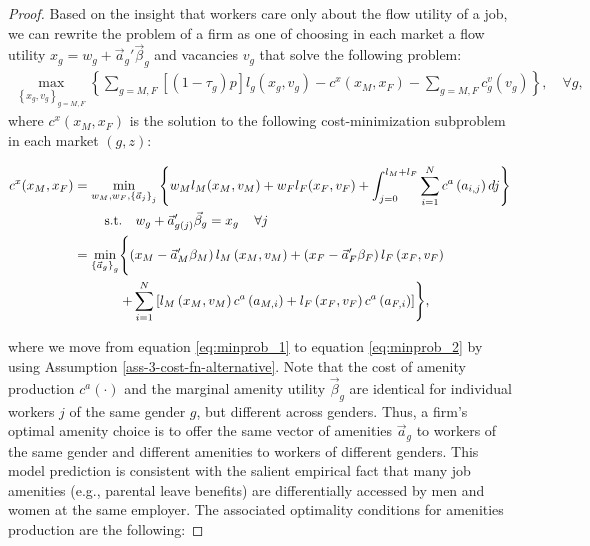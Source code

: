 \begin{proof}
    Based on the insight that workers care only about the flow utility of a job, we can rewrite the problem of a firm as one of choosing
    in each market a flow utility $x_{g}=w_{g}+\vec{a}_{g}'\vec{\beta}_{g}$ and vacancies $v_{g}$ that solve the following problem:
    \begin{align}
        \max_{\left\{ x_{g},v_{g}\right\}_{g=M,F}} \left\{ \sum_{g=M,F} \left[ (1 - \tau_g) p \right] l_{g}\left( x_{g}, v_{g} \right)-c^{x} \left( x_{M}, x_{F} \right) - \sum_{g=M,F} c_{g}^{v} \left( v_{g} \right) \right\} , \quad \forall g,
    \end{align}
    where $c^{x}\left(x_{M},x_{F}\right)$ is the solution to the following cost-minimization subproblem in each market $(g, z)$:
    \begin{small}
        \begin{align}
            c^{x}(x_{M},x_{F}) &= \min_{w_{M},w_{F},\left\{ \vec{a}_{j}\right\} _{j}}\left\{ w_{M}l_{M}(x_{M},v_{M})+w_{F}l_{F}(x_{F},v_{F})+\int_{j=0}^{l_{M}+l_{F}}\sum_{i=1}^{N}c^{a}\left(a_{i,j}\right)dj\right\} \label{eq:minprob_1} \\
            & \mathrel{\phantom{=}} \quad \text{s.t.}\quad w_{g}+\vec{a}_{g(j)}'\vec{\beta}_{g}=x_{g}\, \quad \forall j \nonumber \\
            &= \min_{\left\{ \vec{a}_{g} \right\}_{g}}\Biggl{\{} \left(x_{M}-\vec{a}_{M}'\beta_{M}\right)l_{M}\left(x_{M},v_{M}\right)+\left(x_{F}-\vec{a}_{F}'\beta_{F}\right)l_{F}\left(x_{F},v_{F}\right) \label{eq:minprob_2} \\
            & \mathrel{\phantom{=}} \quad\quad \,\, + \sum_{i=1}^{N}\left[l_{M}\left(x_{M},v_{M}\right)c^{a}\left(a_{M,i}\right)+l_{F}\left(x_{F},v_{F}\right)c^{a}\left(a_{F,i}\right)\right]\Biggr{\}}, \nonumber
        \end{align}
    \end{small}
    where we move from equation \eqref{eq:minprob_1} to equation \eqref{eq:minprob_2} by using Assumption \ref{ass-3-cost-fn-alternative}. Note that the cost of amenity production $c^{a}(\cdot)$ and the marginal amenity utility $\vec{\beta}_{g}$ are identical for individual workers $j$ of the same gender $g$, but different across genders. Thus, a firm's optimal amenity choice is to offer the same vector of amenities $\vec{a}_g$ to workers of the same gender and different amenities to workers of different genders. This model prediction is consistent with the salient empirical fact that many job amenities (e.g., parental leave benefits) are differentially accessed by men and women at the same employer. The associated optimality conditions for amenities production are the following:

\end{proof}
